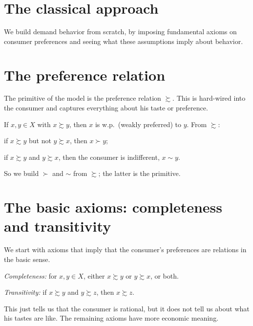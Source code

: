 \documentclass[11pt]{article}
\begin{document}


\section{The classical approach}

We build demand behavior from scratch, by imposing fundamental axioms on consumer
preferences and seeing what these assumptions imply about behavior.


\section{The preference relation}

The primitive of the model is the preference relation $\succsim$. This is
hard-wired into the consumer and captures everything about his taste or
preference.

If $x,y\in X$ with $x\succsim y$, then $x$ is w.p.\ (weakly preferred) to $y$.
From $\succsim$:

\begin{flatlist}
  \item if $x\succsim y$ but not $y\succsim x$, then $x\succ y$;
  \item if $x\succsim y$ and $y\succsim x$, then the consumer is indifferent,
        $x\sim y$.
\end{flatlist}

\noindent
So we build $\succ$ and $\sim$ from $\succsim$; the latter is the primitive.


\section{The basic axioms: completeness and transitivity}

We start with axioms that imply that the consumer's preferences are relations in
the basic sense.

\begin{flatlist}
  \item \emph{Completeness:} for $x,y\in X$, either $x\succsim y$ or
        $y\succsim x$, or both.
  \item \emph{Transitivity:} if $x\succsim y$ and $y\succsim z$, then
        $x\succsim z$.
\end{flatlist}

This just tells us that the consumer is rational, but it does not tell us about
what his tastes are like. The remaining axioms have more economic meaning.
\end{document}
